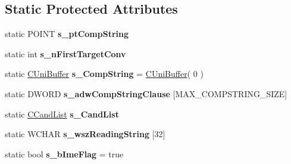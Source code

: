 \subsection*{Static Protected Attributes}
\begin{DoxyCompactItemize}
\item 
\hypertarget{class_c_d_x_u_t_i_m_e_edit_box_a784afa5dea8c27e3f6d7ad9972536d4a}{static P\+O\+I\+N\+T {\bfseries s\+\_\+pt\+Comp\+String}}\label{class_c_d_x_u_t_i_m_e_edit_box_a784afa5dea8c27e3f6d7ad9972536d4a}

\item 
\hypertarget{class_c_d_x_u_t_i_m_e_edit_box_af459146e6164aa670ca187920a3e5ba0}{static int {\bfseries s\+\_\+n\+First\+Target\+Conv}}\label{class_c_d_x_u_t_i_m_e_edit_box_af459146e6164aa670ca187920a3e5ba0}

\item 
\hypertarget{class_c_d_x_u_t_i_m_e_edit_box_ab6fd6572bf140a685ca9227690fc8bb1}{static \hyperlink{class_c_uni_buffer}{C\+Uni\+Buffer} {\bfseries s\+\_\+\+Comp\+String} = \hyperlink{class_c_uni_buffer}{C\+Uni\+Buffer}( 0 )}\label{class_c_d_x_u_t_i_m_e_edit_box_ab6fd6572bf140a685ca9227690fc8bb1}

\item 
\hypertarget{class_c_d_x_u_t_i_m_e_edit_box_ac2f3b1d2aedb78d1cf1e4aa1f816c58b}{static D\+W\+O\+R\+D {\bfseries s\+\_\+adw\+Comp\+String\+Clause} \mbox{[}M\+A\+X\+\_\+\+C\+O\+M\+P\+S\+T\+R\+I\+N\+G\+\_\+\+S\+I\+Z\+E\mbox{]}}\label{class_c_d_x_u_t_i_m_e_edit_box_ac2f3b1d2aedb78d1cf1e4aa1f816c58b}

\item 
\hypertarget{class_c_d_x_u_t_i_m_e_edit_box_aba2312ad3f47e27702ce20c5055416e6}{static \hyperlink{struct_c_d_x_u_t_i_m_e_edit_box_1_1_c_cand_list}{C\+Cand\+List} {\bfseries s\+\_\+\+Cand\+List}}\label{class_c_d_x_u_t_i_m_e_edit_box_aba2312ad3f47e27702ce20c5055416e6}

\item 
\hypertarget{class_c_d_x_u_t_i_m_e_edit_box_a858d222d1a4282ce8154bb3867018e1f}{static W\+C\+H\+A\+R {\bfseries s\+\_\+wsz\+Reading\+String} \mbox{[}32\mbox{]}}\label{class_c_d_x_u_t_i_m_e_edit_box_a858d222d1a4282ce8154bb3867018e1f}

\item 
\hypertarget{class_c_d_x_u_t_i_m_e_edit_box_ad0cd626aa5429db22d2d183aa895f78b}{static bool {\bfseries s\+\_\+b\+Ime\+Flag} = true}\label{class_c_d_x_u_t_i_m_e_edit_box_ad0cd626aa5429db22d2d183aa895f78b}

\end{DoxyCompactItemize}

